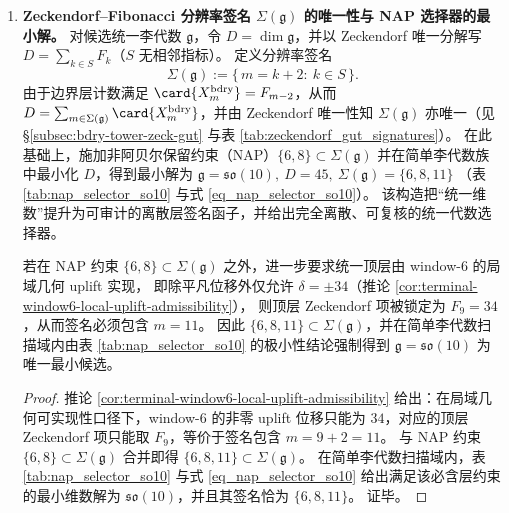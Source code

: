 \begin{enumerate}
  \item \textbf{Zeckendorf--Fibonacci 分辨率签名 \texorpdfstring{$\Sigma(\mathfrak g)$}{Sigma(g)} 的唯一性与 NAP 选择器的最小解。}
  对候选统一李代数 \(\mathfrak g\)，令 \(D=\dim\mathfrak g\)，并以 Zeckendorf 唯一分解写
  \(D=\sum_{k\in S}F_k\)（\(S\) 无相邻指标）。
  定义分辨率签名
  \[
  \Sigma(\mathfrak g):=\{\,m=k+2:\ k\in S\,\}.
  \]
  由于边界层计数满足 \(\card{X_m^{\mathrm{bdry}}}=F_{m-2}\)，从而
  \(D=\sum_{m\in\Sigma(\mathfrak g)}\card{X_m^{\mathrm{bdry}}}\)，并由 Zeckendorf 唯一性知 \(\Sigma(\mathfrak g)\) 亦唯一（见 \S\ref{subsec:bdry-tower-zeck-gut} 与表 \ref{tab:zeckendorf_gut_signatures}）。
  在此基础上，施加非阿贝尔保留约束（NAP）\(\{6,8\}\subset \Sigma(\mathfrak g)\) 并在简单李代数族中最小化 \(D\)，得到最小解为
  \(
  \mathfrak g=\mathfrak{so}(10),\ D=45,\ \Sigma(\mathfrak g)=\{6,8,11\}
  \)
  （表 \ref{tab:nap_selector_so10} 与式 \ref{eq_nap_selector_so10}）。
  该构造把“统一维数”提升为可审计的离散层签名函子，并给出完全离散、可复核的统一代数选择器。

  \begin{corollary}\label{cor:nap-local-uplift-forces-so10}
  若在 NAP 约束 \(\{6,8\}\subset\Sigma(\mathfrak g)\) 之外，进一步要求统一顶层由 window-\(6\) 的局域几何 uplift 实现，
  即除平凡位移外仅允许 \(\delta=\pm 34\)（推论 \ref{cor:terminal-window6-local-uplift-admissibility}），
  则顶层 Zeckendorf 项被锁定为 \(F_9=34\)，从而签名必须包含 \(m=11\)。
  因此 \(\{6,8,11\}\subset \Sigma(\mathfrak g)\)，并在简单李代数扫描域内由表 \ref{tab:nap_selector_so10} 的极小性结论强制得到
  \(\mathfrak g=\mathfrak{so}(10)\) 为唯一最小候选。
  \end{corollary}
  \begin{proof}
  推论 \ref{cor:terminal-window6-local-uplift-admissibility} 给出：在局域几何可实现性口径下，window-\(6\) 的非零 uplift 位移只能为 \(34\)，对应的顶层 Zeckendorf 项只能取 \(F_9\)，等价于签名包含 \(m=9+2=11\)。
  与 NAP 约束 \(\{6,8\}\subset \Sigma(\mathfrak g)\) 合并即得 \(\{6,8,11\}\subset \Sigma(\mathfrak g)\)。
  在简单李代数扫描域内，表 \ref{tab:nap_selector_so10} 与式 \ref{eq_nap_selector_so10} 给出满足该必含层约束的最小维数解为 \(\mathfrak{so}(10)\)，并且其签名恰为 \(\{6,8,11\}\)。
  证毕。
  \end{proof}


\end{enumerate}
